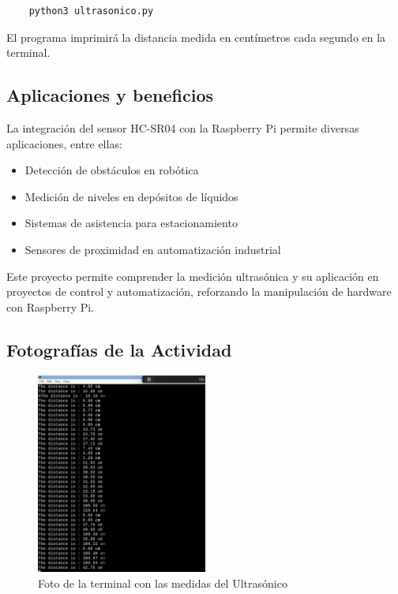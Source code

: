 \begin{verbatim}
	python3 ultrasonico.py
\end{verbatim}

El programa imprimirá la distancia medida en centímetros cada segundo en la terminal.

\subsection{Aplicaciones y beneficios}
La integración del sensor HC-SR04 con la Raspberry Pi permite diversas aplicaciones, entre ellas:

\begin{itemize}
	\item Detección de obstáculos en robótica
	\item Medición de niveles en depósitos de líquidos
	\item Sistemas de asistencia para estacionamiento
	\item Sensores de proximidad en automatización industrial
\end{itemize}

Este proyecto permite comprender la medición ultrasónica y su aplicación en proyectos de control y automatización, reforzando la manipulación de hardware con Raspberry Pi.

\subsection{Fotografías de la Actividad}

\begin{figure}[h]
	\centering
	\includegraphics[width=0.5\textwidth]{imagenes/terminal}
	\caption{Foto de la terminal con las medidas del Ultrasónico}
\end{figure}

